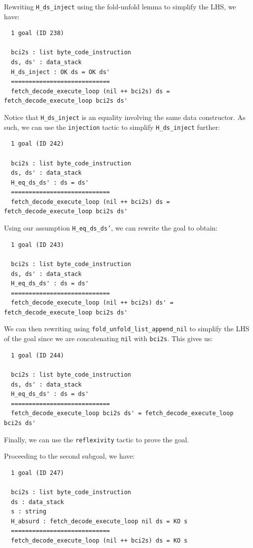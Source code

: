 \documentclass{article}
\begin{document}
Rewriting \texttt{H\_ds\_inject} using the fold-unfold lemma to simplify the LHS, we have:

\begin{lstlisting}
  1 goal (ID 238)
  
  bci2s : list byte_code_instruction
  ds, ds' : data_stack
  H_ds_inject : OK ds = OK ds'
  ============================
  fetch_decode_execute_loop (nil ++ bci2s) ds = fetch_decode_execute_loop bci2s ds'
\end{lstlisting}

Notice that \texttt{H\_ds\_inject} is an equality involving the same data constructor. As such, we can use the \texttt{injection} tactic to simplify \texttt{H\_ds\_inject} further:

\begin{lstlisting}
  1 goal (ID 242)
  
  bci2s : list byte_code_instruction
  ds, ds' : data_stack
  H_eq_ds_ds' : ds = ds'
  ============================
  fetch_decode_execute_loop (nil ++ bci2s) ds = fetch_decode_execute_loop bci2s ds'
\end{lstlisting}

Using our assumption \texttt{H\_eq\_ds\_ds'}, we can rewrite the goal to obtain:

\begin{lstlisting}
  1 goal (ID 243)
  
  bci2s : list byte_code_instruction
  ds, ds' : data_stack
  H_eq_ds_ds' : ds = ds'
  ============================
  fetch_decode_execute_loop (nil ++ bci2s) ds' = fetch_decode_execute_loop bci2s ds'
\end{lstlisting}

We can then rewriting using \texttt{fold\_unfold\_list\_append\_nil} to simplify the LHS of the goal since we are concatenating \texttt{nil} with \texttt{bci2s}. This gives us:

\begin{lstlisting}
  1 goal (ID 244)
  
  bci2s : list byte_code_instruction
  ds, ds' : data_stack
  H_eq_ds_ds' : ds = ds'
  ============================
  fetch_decode_execute_loop bci2s ds' = fetch_decode_execute_loop bci2s ds'
\end{lstlisting}

Finally, we can use the \texttt{reflexivity} tactic to prove the goal.

Proceeding to the second subgoal, we have:

\begin{lstlisting}
  1 goal (ID 247)
  
  bci2s : list byte_code_instruction
  ds : data_stack
  s : string
  H_absurd : fetch_decode_execute_loop nil ds = KO s
  ============================
  fetch_decode_execute_loop (nil ++ bci2s) ds = KO s
\end{lstlisting}
\end{document}
